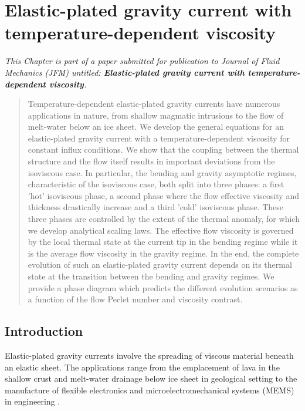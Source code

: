 \chapter[Cooling elastic-plated gravity current]{Elastic-plated gravity current with temperature-dependent
  viscosity}
\label{C3-JFM}

\textit{This Chapter is  part of a paper submitted  for publication to
  Journal  of Fluid  Mechanics (JFM)  untitled: \textbf{Elastic-plated
    gravity current with temperature-dependent viscosity}.}


\minitoc

\begin{abstract}
  Temperature-dependent elastic-plated gravity  currents have numerous
  applications in nature, from shallow magmatic intrusions to the flow
  of melt-water below  an ice sheet. We develop  the general equations
  for an  elastic-plated gravity current with  a temperature-dependent
  viscosity for constant influx conditions.  We show that the coupling
  between  the  thermal  structure  and the  flow  itself  results  in
  important deviations  from the  isoviscous case. In  particular, the
  bending  and  gravity  asymptotic  regimes,  characteristic  of  the
  isoviscous  case,  both  split  into three  phases:  a  first  'hot'
  isoviscous phase, a second phase  where the flow effective viscosity
  and  thickness drastically  increase and  a third  'cold' isoviscous
  phase.   These three  phases are  controlled  by the  extent of  the
  thermal anomaly, for  which we develop analytical  scaling laws. The
  effective flow viscosity  is governed by the local  thermal state at
  the current tip  in the bending regime while it  is the average flow
  viscosity in the gravity regime.  In the end, the complete evolution
  of such  an elastic-plated  gravity current  depends on  its thermal
  state at the transition between  the bending and gravity regimes. We
  provide  a  phase diagram  which  predicts  the different  evolution
  scenarios  as a  function of  the flow  Peclet number  and viscosity
  contrast.

\end{abstract}


\section{Introduction}

Elastic-plated  gravity  currents  involve the  spreading  of  viscous
material beneath  an elastic  sheet. The  applications range  from the
emplacement      of      lava      in      the      shallow      crust
\citep{Michaut:2011kg,Bunger:2011cb} and melt-water drainage below ice
sheet  \citep{Das:2008in,Tsai:2010ev}  in  geological setting  to  the
manufacture of flexible electronics and microelectromechanical systems
(MEMS) in engineering \citep{Hosoi:2004dn}.

